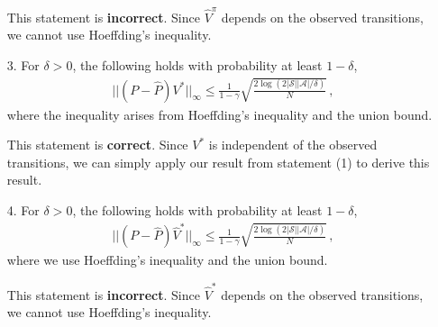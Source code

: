 \begin{itemize}[leftmargin=0.2in]
    \begin{sol}
        This statement is \textbf{incorrect}. Since $\hat{V}^\pi$ depends on the observed transitions, we cannot use Hoeffding's inequality. 
    \end{sol}

    \item[3.] For $\delta > 0$, the following holds with probability at least $1 - \delta$,
    \begin{align*}
    ||(P - \widehat{P}) V^*||_{\infty} 
    \leq 
    \frac{1}{1- \gamma} \sqrt{\frac{2 \log(2|\mathcal{S}||\mathcal{A}|/\delta)}{N}}\,,
    \end{align*}
    where the inequality arises from Hoeffding's inequality and the union bound.

    \begin{sol}
        This statement is \textbf{correct}. Since $V^*$ is independent of the observed transitions, we can simply apply our result from statement (1) to derive this result.
    \end{sol}

    \item[4.] For $\delta > 0$, the following holds with probability at least $1 - \delta$,
    \begin{align*}
    ||(P - \widehat{P}) \widehat{V}^*||_{\infty} 
    \leq 
    \frac{1}{1- \gamma} \sqrt{\frac{2 \log(2|\mathcal{S}||\mathcal{A}|/\delta)}{N}}\,,
    \end{align*}
    where we use Hoeffding's inequality and the union bound.

    \begin{sol}
        This statement is \textbf{incorrect}. Since $\hat{V}^*$ depends on the observed transitions, we cannot use Hoeffding's inequality. 
    \end{sol}
\end{itemize}